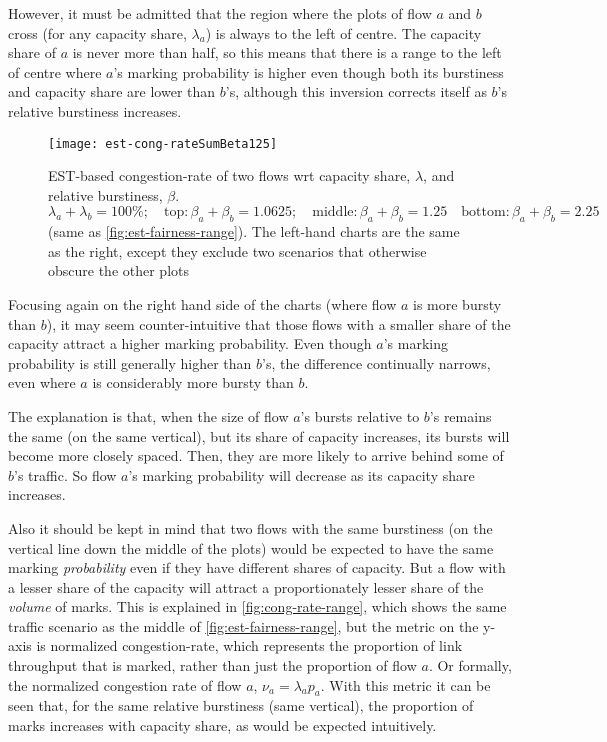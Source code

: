 However, it must be admitted that the region where the plots of flow \(a\) and \(b\) cross (for any capacity share, \(\lambda_a\)) is always to the left of centre. The capacity share of \(a\) is never more than half, so this means that there is a range to the left of centre where \(a\)'s marking probability is higher even though both its burstiness and capacity share are lower than \(b\)'s, although this inversion corrects itself as \(b\)'s relative burstiness increases.

\begin{figure*}[t!]
	\centering
	\texttt{[image: est-cong-rateSumBeta125]}
	\caption{EST-based congestion-rate of two flows wrt capacity share, \(\lambda\), and relative burstiness, \(\beta\).\\
		\(\lambda_a+\lambda_b=100\%; \quad\mathrm{top:} \beta_a+\beta_b=1.0625; \quad\mathrm{middle:} \beta_a+\beta_b=1.25 
		\quad\mathrm{bottom:} \beta_a+\beta_b=2.25\) (same as \autoref{fig:est-fairness-range}). 
		The left-hand charts are the same as the right, except they exclude two scenarios that otherwise obscure the other plots}\label{fig:cong-rate-range}
\end{figure*}

Focusing again on the right hand side of the charts (where flow \(a\) is more bursty than \(b\)), it may seem counter-intuitive that those flows with a smaller share of the capacity attract a higher marking probability. Even though \(a\)'s marking probability is still generally higher than \(b\)'s, the difference continually narrows, even where \(a\) is considerably more bursty than \(b\).

The explanation is that, when the size of flow \(a\)'s bursts relative to \(b\)'s remains the same (on the same vertical), but its share of capacity increases, its bursts will become more closely spaced. Then, they are more likely to arrive behind some of \(b\)'s traffic. So flow \(a\)'s marking probability will decrease as its capacity share increases.

Also it should be kept in mind that two flows with the same burstiness (on the vertical line down the middle of the plots) would be expected to have the same marking \emph{probability} even if they have different shares of capacity. But a flow with a lesser share of the capacity will attract a proportionately lesser share of the \emph{volume} of marks. This is explained in \autoref{fig:cong-rate-range}, which shows the same traffic scenario as the middle of \autoref{fig:est-fairness-range}, but the metric on the y-axis is normalized congestion-rate, which represents the proportion of link throughput that is marked, rather than just the proportion of flow \(a\). Or formally, the normalized congestion rate of flow \(a\), \(\nu_a = \lambda_a p_a\). With this metric it can be seen that, for the same relative burstiness (same vertical), the proportion of marks increases with capacity share, as would be expected intuitively.

